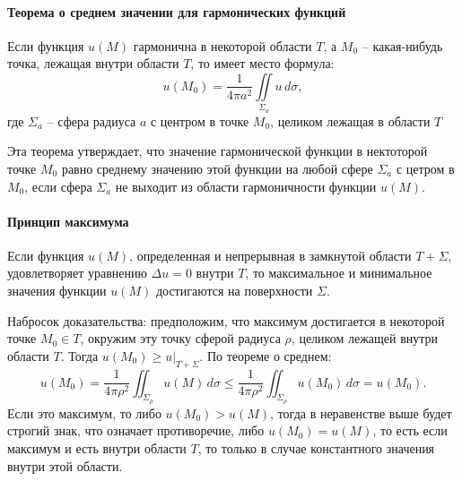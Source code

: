 \paragraph{Теорема о среднем значении для гармонических функций}
\begin{theorem}
  Если функция $u(M)$ гармонична в некоторой области $T$, а $M_0$ -- какая-нибудь точка, лежащая
  внутри области $T$, то имеет место формула:
  \[
    u(M_0) = \dfrac{1}{4\pi a^2} \iint \limits_{\Sigma_a} u \, d\sigma,
  \]
  где $\Sigma_a$ -- сфера радиуса $a$ с центром в точке $M_0$, целиком лежащая в области $T$
\end{theorem}

Эта теорема утверждает, что значение гармонической функции в нектоторой точке $M_0$ равно
среднему значению этой функции на любой сфере $\Sigma_a$ с цетром в $M_0$, если сфера
$\Sigma_a$ не выходит из области гармоничности функции $u(M)$.

\paragraph{Принцип максимума}

\begin{theorem}
  Если функция $u(M)$, определенная и непрерывная в замкнутой области $T+\Sigma$, удовлетворяет
  уравнению $\Delta u = 0$ внутри $T$, то максимальное и минимальное значения функции $u(M)$
  достигаются на поверхности $\Sigma$.
\end{theorem}

Набросок доказательства: предположим, что максимум достигается в некоторой точке $M_0 \in T$,
окружим эту точку сферой радиуса $\rho$, целиком лежащей внутри области $T$. Тогда
$u(M_0) \geqslant \left. u \right|_{T+\Sigma}$. По теореме о среднем: 
\[
  u(M_0) = \dfrac{1}{4\pi \rho^2} \iint_{\Sigma_\rho} u(M) \, d\sigma \leqslant 
  \dfrac{1}{4\pi \rho^2} \iint_{\Sigma_\rho} u(M_0) \, d\sigma = u(M_0).
\]
Если это максимум, то либо $u(M_0) > u(M)$, тогда в неравенстве выше будет строгий знак, что
означает противоречие, либо $u(M_0) = u(M)$, то есть если максимум и есть внутри области $T$, 
то только в случае константного значения внутри этой области.
